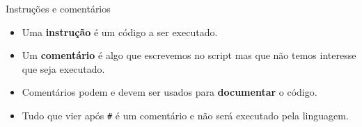 \documentclass[
  ignorenonframetext,
  serif,
  professionalfont,
  usenames,
  dvipsnames,
  aspectratio = 169]{beamer}
\providecommand{\tightlist}{%
  \setlength{\itemsep}{0pt}\setlength{\parskip}{0pt}}
\renewcommand{\tightlist}{%
  \setlength{\itemsep}{0\baselineskip}
  \setlength{\parskip}{0.25\baselineskip}
}
\begin{document}
\begin{frame}[fragile]{Instruções e comentários}
\label{instruuxe7uxf5es-e-comentuxe1rios}
\begin{itemize}
\tightlist
\item
  Uma \textbf{instrução} é um código a ser executado.
\end{itemize}

\vspace{0.3cm}

\begin{itemize}
\tightlist
\item
  Um \textbf{comentário} é algo que escrevemos no script mas que não
  temos interesse que seja executado.
\end{itemize}

\vspace{0.3cm}

\begin{itemize}
\tightlist
\item
  Comentários podem e devem ser usados para \textbf{documentar} o
  código.
\end{itemize}

\vspace{0.3cm}

\begin{itemize}
\tightlist
\item
  Tudo que vier após \texttt{\#} é um comentário e não será executado
  pela linguagem.
\end{itemize}
\end{frame}
\end{document}
